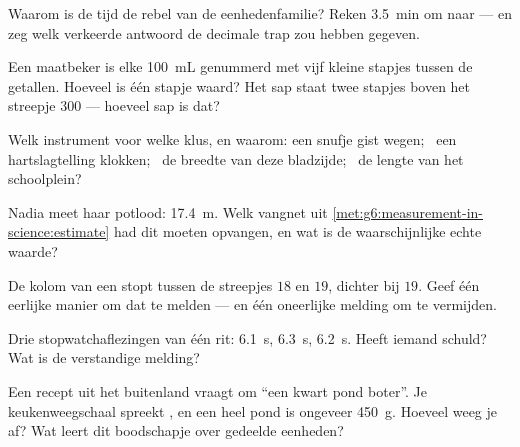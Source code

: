 \begin{exercise}[$\star$]\label{exo:g6:measurement-in-science:3}
Waarom is de tijd de rebel van de eenhedenfamilie? Reken
\qty{3.5}{min} om naar  --- en zeg welk verkeerde antwoord de
decimale trap zou hebben gegeven.
\end{exercise}

\begin{exercise}[$\star$]\label{exo:g6:measurement-in-science:4}
Een maatbeker is elke \qty{100}{mL} genummerd met vijf kleine stapjes
tussen de getallen. Hoeveel is één stapje waard? Het sap staat twee
stapjes boven het streepje $300$ --- hoeveel sap is dat?
\end{exercise}

\begin{exercise}[$\star$]\label{exo:g6:measurement-in-science:5}
Welk instrument voor welke klus, en waarom: een snufje gist wegen; \
een hartslagtelling klokken; \ de breedte van deze bladzijde; \ de
lengte van het schoolplein?
\end{exercise}

\begin{exercise}[$\star$]\label{exo:g6:measurement-in-science:6}
Nadia meet haar potlood: \qty{17.4}{m}. Welk vangnet uit
\cref{met:g6:measurement-in-science:estimate} had dit moeten opvangen,
en wat is de waarschijnlijke echte waarde?
\end{exercise}

\begin{exercise}[$\star$]\label{exo:g6:measurement-in-science:7}
De kolom van een  stopt tussen de streepjes $18$ en $19$,
dichter bij $19$. Geef één eerlijke manier om dat te melden --- en één
oneerlijke melding om te vermijden.
\end{exercise}

\begin{exercise}[$\star$]\label{exo:g6:measurement-in-science:8}
Drie stopwatchaflezingen van één rit: \qty{6.1}{s}, \qty{6.3}{s},
\qty{6.2}{s}. Heeft iemand schuld? Wat is de verstandige melding?
\end{exercise}

\begin{exercise}[$\star\star$]\label{exo:g6:measurement-in-science:9}
Een recept uit het buitenland vraagt om ``een kwart pond boter''. Je
keukenweegschaal spreekt , en een heel pond is ongeveer
\qty{450}{g}. Hoeveel \omterm{def:g3:measuring-mass:units}{gram} weeg je af? Wat leert dit boodschapje over
gedeelde eenheden?
\end{exercise}


